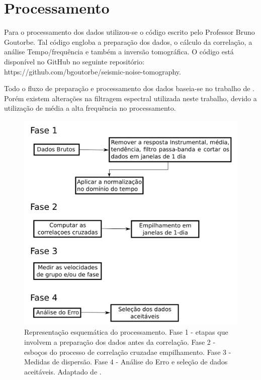 \section{Processamento}

Para o processamento dos dados utilizou-se o código escrito pelo Professor Bruno Goutorbe. Tal código engloba a preparação dos dados, o cálculo da correlação, a análise Tempo/frequência e também a inversão tomográfica.  O código está disponível no GitHub no seguinte repositório: https://github.com/bgoutorbe/seismic-noise-tomography.

Todo o fluxo de preparação e processamento dos dados  baseia-se no trabalho de \cite{bensen_processing_2007}. Porém existem alterações na filtragem espectral utilizada neste trabalho, devido a utilização de média a alta frequência no processamento.

\begin{figure}[!ht]
\centering
\includegraphics[scale=0.8]{Figs/fluxograma_bensen2007.png}
\caption[Representação esquemática do processamento.]{Representação esquemática do processamento. Fase 1 - etapas que involvem a preparação dos dados antes da correlação. Fase 2 - esboços do processo de correlação cruzadae empilhamento. Fase 3 -Medidas de dispersão. Fase 4 - Análise do Erro e seleção de dados aceitáveis. Adaptado de \cite{bensen_processing_2007}.}
\label{fluxograma_bensen2007}
\end{figure} 

